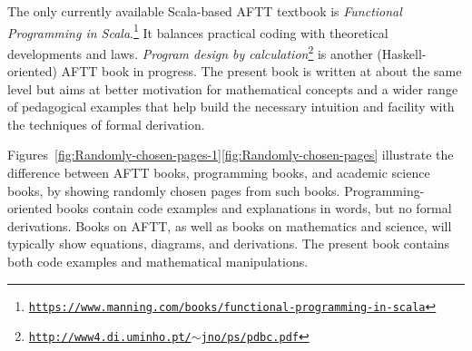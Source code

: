 The only currently available Scala-based AFTT textbook is \emph{Functional
Programming in Scala}.\footnote{\texttt{\href{https://www.manning.com/books/functional-programming-in-scala}{https://www.manning.com/books/functional-programming-in-scala}}}
It balances practical coding with theoretical developments and laws.
\emph{Program design by calculation}\footnote{\texttt{\href{http://www4.di.uminho.pt/~jno/ps/pdbc.pdf}{http://www4.di.uminho.pt/$\sim$jno/ps/pdbc.pdf}}}
is another (Haskell-oriented) AFTT book in progress. The present book
is written at about the same level but aims at better motivation for
mathematical concepts and a wider range of pedagogical examples that
help build the necessary intuition and facility with the techniques
of formal derivation. 

Figures~\ref{fig:Randomly-chosen-pages-1}\textendash \ref{fig:Randomly-chosen-pages}
illustrate the difference between AFTT books, programming books, and
academic science books, by showing randomly chosen pages from such
books. Programming-oriented books contain code examples and explanations
in words, but no formal derivations. Books on AFTT, as well as books
on mathematics and science, will typically show equations, diagrams,
and derivations. The present book contains both code examples and
mathematical manipulations.

